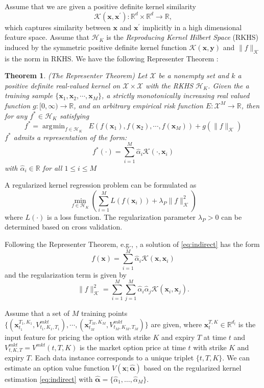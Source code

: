 \documentclass[letterpaper,12pt,titlepage,oneside,final]{book}
\numberwithin{equation}{section}
\newtheorem{thm}{Theorem}[section]
\theoremstyle{definition}
\newcommand{\vx}{\mathbf{x}}
\newcommand{\HK}{\mathcal{H}_K}
\newcommand{\XS}{\mathcal{X}}
\newcommand{\Real}{\mathbb{R}}
\DeclareMathOperator*{\argmin}{\arg\!\min}
\newcommand{\valpha}{\pmb{\widehat{\alpha}}}
\newcommand{\Vmkt}{V^{mkt}}
\begin{document}
Assume that we are given a positive definite kernel similarity
 $$
 \mathcal{K}(\vx, \vx^\prime) : \Real^{d} \times \Real^{d} \rightarrow  \Real,
 $$
 which captures  similarity between $\vx$ and $\vx^\prime$ implicitly in a high dimensional feature space.
 Assume that $\HK$ is the  \emph{Reproducing Kernel Hilbert Space} (RKHS) induced by the symmetric positive definite kernel function $ \mathcal{K}(\mathbf{x},\mathbf{y})$ and $\|f\|_{ \mathcal{K}}$ is the norm in RKHS.
 We have the following Representer Theorem \citep{wahba1990spline}:
\begin{thm}\label{pc:representer}
 (The Representer Theorem)
Let $\XS$ be a nonempty set and $k$ a positive definite real-valued kernel on $\XS \times \XS$ with the RKHS $\HK$.  Given the a training sample $
 \{\mathbf{x}_1, \mathbf{x}_2, \cdots, \mathbf{x}_M\} $, a strictly monotonically increasing real valued function $g:[0, \infty) \rightarrow \Real $,  and an arbitrary empirical risk function $E:\XS^M \rightarrow \Real $, then for any $f^* \in \HK$ satisfying
 \[
 f^*=\argmin_{f \in \HK} \;\;E\left(f(\mathbf{x}_1), f(\mathbf{x}_2), \cdots, f(\mathbf{x}_M)\right) + g( \|f\|_{\mathcal{K}})
 \]
 $f^*$ admits a representation of the form:
 \[
 f^*(\cdot)=\sum_{i=1}^M \widehat{\alpha}_i \mathcal{K}(\cdot,\mathbf{x}_i)
 \]
 with $\widehat{\alpha}_i \in \Real$  for all $1 \leq i \leq M$
\end{thm}

A regularized kernel regression problem can be formulated as
\begin{equation}
\min_{f \in \HK}\left(  \sum_{i=1}^M L(f(\vx_i))+\lambda_P \|f\|^2_{\mathcal{K}}\right)
\label{eq:indirect}
\end{equation}
where $L(\cdot)$ is a loss function.
The regularization parameter $\lambda_P>0$  can be determined based on cross validation.

Following the Representer Theorem,  e.g., \citep{wahba1990spline}, a solution of  \eqref{eq:indirect} has the form
\begin{equation}\label{kr1}
f(\mathbf{x})=\sum_{i=1}^M \widehat{\alpha}_i \mathcal{K}(\mathbf{x},\mathbf{x}_i)
\end{equation}
and the regularization term is given by
\begin{equation}\label{kr2}
\|f\|_{\mathcal{K}}^2=\sum_{i=1}^M \sum_{j=1}^M  \widehat{\alpha}_i \widehat{\alpha}_j \mathcal{K}(\mathbf{x}_i,\mathbf{x}_j).
\end{equation}


Assume that a set of $M$ training points $
 \{ (\vx_{t_1}^{T_1,K_1},V^{mkt}_{t_1,K_1,T_1}), \cdots, (\vx_{t_M}^{T_M,K_M},V^{mkt}_{t_M,K_M,T_M})\} $ are given, where
$
\vx_{t}^{T,K}  \in \Real^{d_l}
$ is the input feature for pricing the option with strike $K$ and expiry $T$ at time $t$ and  $V^{mkt}_{t,K,T}=\Vmkt(t,T,K)$ is the market option price at time $t$ with strike $K$ and expiry $T$.  Each data instance corresponds to a unique triplet $\{t,T,K\}$.
We can estimate an option value function $V(\vx;\mathbf{\valpha})$ based on the regularized kernel estimation \eqref{eq:indirect} with $\valpha=\{\widehat{\alpha}_1,\dots,\widehat{\alpha}_M\}$.
\end{document}
